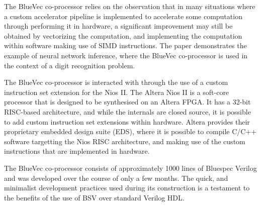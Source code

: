 \documentclass[a4paper,8pt]{report}
\begin{document}
The BlueVec co-processor relies on the observation that in many situations where
a custom accelerator pipeline is implemented to accelerate some computation
through performing it in hardware, a significant improvement may still be obtained
by vectorizing the computation, and implementing the computation within
software making use of SIMD instructions. The paper demonstrates the example of
neural network inference, where the BlueVec co-processor is used in the context
of a digit recognition problem.

The BlueVec co-processor is interacted with through the use of a custom
instruction set extension for the Nios II. The Altera Nios II is a soft-core processor
that is designed to be synthesised on an Altera FPGA. It has a 32-bit RISC-based
architecture, and while the internals are closed source, it is possible to add
custom instruction set extensions within hardware. Altera provides their
proprietary embedded design suite (EDS), where it is possible to compile C/C++
software targetting the Nios RISC architecture, and making use of the custom
instructions that are implemented in hardware.





The BlueVec co-processor consists of approximately 1000 lines of Bluespec
Verilog and was developed over the course of only a few months. The quick, and
minimalist development practices used during its construction is a testament to
the benefits of the use of BSV over standard Verilog HDL.
\end{document}
